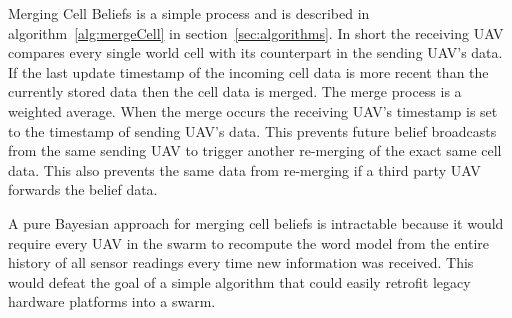 
	

Merging Cell Beliefs is a simple process and is described in algorithm~\ref{alg:mergeCell} in section~\ref{sec:algorithms}.   In short the receiving UAV compares every single world cell with its counterpart in the sending UAV's data.  If the last update timestamp of the incoming cell data is more recent than the currently stored data then the cell data is merged.  The merge process is a weighted average.  When the merge occurs the receiving UAV's timestamp is set to the timestamp of sending UAV's data.  This prevents future belief broadcasts from the same sending UAV to trigger another re-merging of the exact same cell data.  This also prevents the same data from re-merging if a third party UAV forwards the belief data. 


A pure Bayesian approach for merging cell beliefs is intractable because it would require every UAV in the swarm to recompute the word model from the entire history of all sensor readings every time new information was received.  This would defeat the goal of a simple algorithm that could easily retrofit legacy hardware platforms into a swarm.



